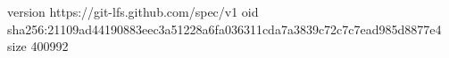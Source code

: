 version https://git-lfs.github.com/spec/v1
oid sha256:21109ad44190883eec3a51228a6fa036311cda7a3839c72c7c7ead985d8877e4
size 400992
